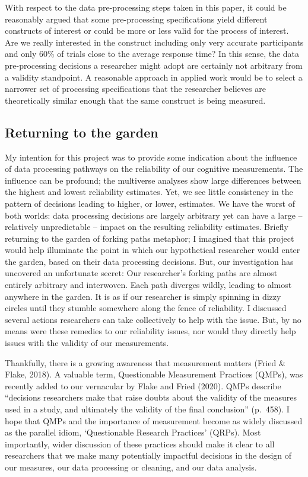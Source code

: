 \documentclass[
  man,floatsintext]{apa6}
\begin{document}
With respect to the data pre-processing steps taken in this paper, it could be reasonably argued that some pre-processing specifications yield different constructs of interest or could be more or less valid for the process of interest. Are we really interested in the construct including only very accurate participants and only 60\% of trials close to the average response time? In this sense, the data pre-processing decisions a researcher might adopt are certainly not arbitrary from a validity standpoint. A reasonable approach in applied work would be to select a narrower set of processing specifications that the researcher believes are theoretically similar enough that the same construct is being measured.

\hypertarget{returning-to-the-garden}{%
\subsection{Returning to the garden}\label{returning-to-the-garden}}

My intention for this project was to provide some indication about the influence of data processing pathways on the reliability of our cognitive measurements. The influence can be profound; the multiverse analyses show large differences between the highest and lowest reliability estimates. Yet, we see little consistency in the pattern of decisions leading to higher, or lower, estimates. We have the worst of both worlds: data processing decisions are largely arbitrary yet can have a large -- relatively unpredictable -- impact on the resulting reliability estimates. Briefly returning to the garden of forking paths metaphor; I imagined that this project would help illuminate the point in which our hypothetical researcher would enter the garden, based on their data processing decisions. But, our investigation has uncovered an unfortunate secret: Our researcher's forking paths are almost entirely arbitrary and interwoven. Each path diverges wildly, leading to almost anywhere in the garden. It is as if our researcher is simply spinning in dizzy circles until they stumble somewhere along the fence of reliability. I discussed several actions researchers can take collectively to help with the issue. But, by no means were these remedies to our reliability issues, nor would they directly help issues with the validity of our measurements.

Thankfully, there is a growing awareness that measurement matters (Fried \& Flake, 2018). A valuable term, Questionable Measurement Practices (QMPs), was recently added to our vernacular by Flake and Fried (2020). QMPs describe ``decisions researchers make that raise doubts about the validity of the measures used in a study, and ultimately the validity of the final conclusion'' (p.~458). I hope that QMPs and the importance of measurement become as widely discussed as the parallel idiom, `Questionable Research Practices' (QRPs). Most importantly, wider discussion of these practices should make it clear to all researchers that we make many potentially impactful decisions in the design of our measures, our data processing or cleaning, and our data analysis.
\end{document}
